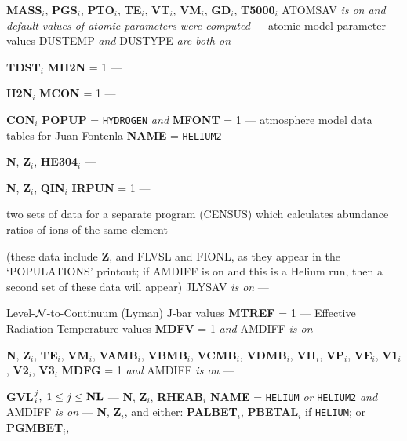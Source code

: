 {\bf MASS}$_i$, {\bf PGS}$_i$, {\bf PTO}$_i$, {\bf TE}$_i$,
{\bf VT}$_i$, {\bf VM}$_i$, {\bf GD}$_i$, {\bf T5000}$_i$
\spice
{} ATOMSAV {\it is on and default values of atomic
parameters were computed} --- \np
atomic model parameter values
\spice
{} DUSTEMP {\it and} DUSTYPE
{\it are both on} --- \par \noindent
{\bf TDST}$_i$
\spice
{} {\bf MH2N} = 1 --- \par \noindent
{\bf H2N}$_i$
\spice
{} {\bf MCON} = 1 --- \par \noindent
{\bf CON}$_i$
\spice
{} {\bf POPUP} = {\tt HYDROGEN} {\it and} {\bf MFONT} = 1 --- \np
atmosphere model data tables for Juan Fontenla
\spice
{} {\bf NAME} = {\tt HELIUM2} --- \par \noindent
{\bf N}, {\bf Z}$_i$, {\bf HE304}$_i$
\spice
{} --- \par \noindent
{\bf N}, {\bf Z}$_i$, {\bf QIN}$_i$
\spice
{} {\bf IRPUN} = 1 --- \par \noindent
two sets of data for a separate program (CENSUS) which calculates abundance
ratios of ions of the same element \par
\spice
\vbox{\parindent=0pt \hangindent=10pt 
(these data include {\bf Z}, and FLVSL and FIONL, as they
appear in the \break `POPULATIONS' printout; if AMDIFF is on
and this is a Helium run, then a second set of these data
will appear)}
\spice
{} JLYSAV {\it is on} --- \par \noindent
Level-$\cal N$-to-Continuum (Lyman) J-bar values
\spice
{} {\bf MTREF} = 1 --- \np
Effective Radiation Temperature values
\ej
{} {\bf MDFV} = 1 {\it and} AMDIFF
{\it is on} --- \par \noindent
{\bf N}, {\bf Z}$_i$, {\bf TE}$_i$, {\bf VM}$_i$,
{\bf VAMB}$_i$, {\bf VBMB}$_i$, {\bf VCMB}$_i$, {\bf VDMB}$_i$, 
{\bf VH}$_i$, {\bf VP}$_i$, {\bf VE}$_i$, {\bf V1}$_i$, 
{\bf V2}$_i$, {\bf V3}$_i$
\spice
{} {\bf MDFG} = 1 {\it and} AMDIFF
{\it is on} --- \par \noindent
{\bf GVL}$_i^j, \; 1 \leq j \leq {\bf NL}$
\spice
{} --- \np
{\bf N}, {\bf Z}$_i$, {\bf RHEAB}$_i$
\spice
{} {\bf NAME} = {\tt HELIUM} {\it or} {\tt HELIUM2}
{\it and} AMDIFF {\it is on} --- \np
{\bf N}, {\bf Z}$_i$, and either: {\bf PALBET}$_i$,
{\bf PBETAL}$_i$ if {\tt HELIUM}; or {\bf PGMBET}$_i$,
